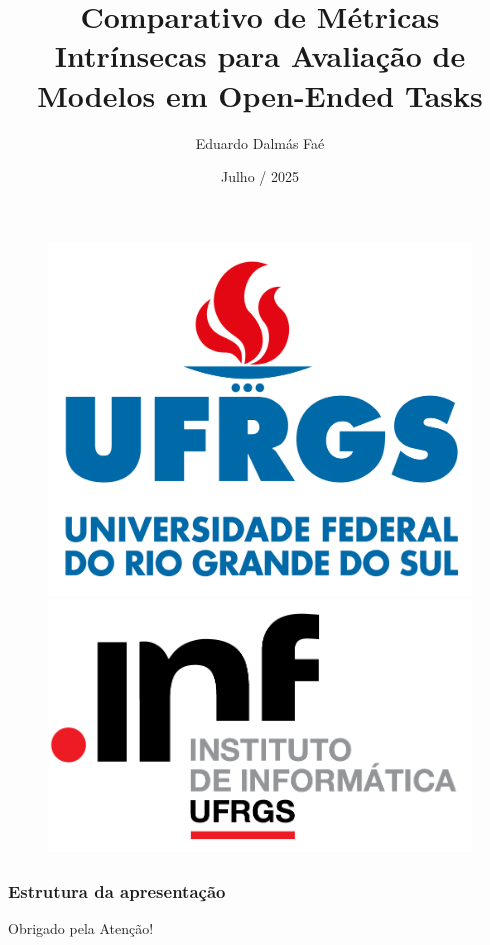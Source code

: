 \documentclass[
    11pt,               %
]{beamer}
\title[Análise de Métricas em OET]{Comparativo de Métricas Intrínsecas para Avaliação de Modelos em Open-Ended Tasks}          %
\author[Eduardo D. Faé]{Eduardo Dalmás Faé} %
\institute[INF-UFRGS]{Instituto de Informática - UFRGS}
\date[2025]{Julho / 2025}
\begin{document}
\begin{frame}[plain,t]
    \begin{figure}
        \includegraphics[height=0.2\textheight]{UFRGS-logo.png}
        \hspace{100px}
        \includegraphics[height=0.2\textheight]{INF-logo.png}
    \end{figure}
    \titlepage
\end{frame}

\begin{frame}
    \frametitle{Estrutura da apresentação}
    \tableofcontents
\end{frame}



% 





\begin{frame}
    \begin{center}
        {\Huge Obrigado pela Atenção!}
    \end{center}
\end{frame}
\end{document}
